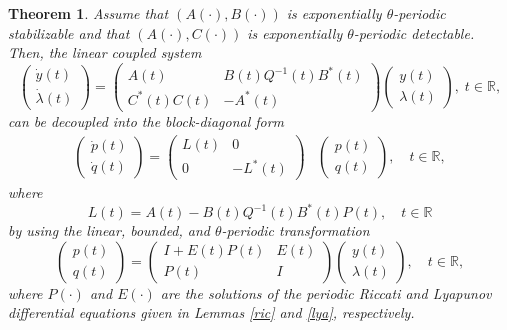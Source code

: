 \documentclass[10pt,a4paper]{amsart}
\newtheorem{theorem}{Theorem}
\begin{document}
	\begin{theorem}\label{dudic}
		Assume that $(A(\cdot),B(\cdot))$ is exponentially $\theta$-periodic stabilizable and that $(A(\cdot),C(\cdot))$ is exponentially $\theta$-periodic detectable. Then, the linear coupled system
		\begin{equation*}
			\begin{pmatrix}
				\dot{y}(t)\\\dot{\lambda}(t)
			\end{pmatrix}=
			\begin{pmatrix}
				A(t) & B(t)Q^{-1}(t)B^*(t)\\C^*(t)C(t)&-A^*(t)
			\end{pmatrix}\begin{pmatrix}
				y(t)\\ \lambda (t)
			\end{pmatrix},\; t\in\mathbb R,
		\end{equation*}
		can be decoupled into the block-diagonal form
		\begin{equation*}
			\begin{split}
				\begin{pmatrix}\dot{p}(t)\\ \dot{q}(t)\end{pmatrix}
				=
				\begin{pmatrix}
					L(t) & 0 \\
					0 & -L^*(t)
				\end{pmatrix}
				&
				\begin{pmatrix}p(t)\\ q(t)\end{pmatrix},\quad t\in\mathbb{R},
			\end{split}
		\end{equation*}
		where
		\begin{equation}\label{eq:A-BQ-1B*P}
			L(t)=A(t)-B(t)Q^{-1}(t)B^*(t)P(t),\quad t\in\mathbb{R}
		\end{equation}
		by using the linear, bounded, and $\theta$-periodic transformation
		\begin{equation}\label{ducan1}
			\begin{pmatrix}
				p(t)\\ q (t)
			\end{pmatrix}=
			\begin{pmatrix}
				I+E(t)P(t)&E(t)\\P(t)&I
			\end{pmatrix}
			\begin{pmatrix}
				y(t)\\  \lambda (t)
			\end{pmatrix},\quad t\in\mathbb R,
		\end{equation}
		where $P(\cdot)$ and $E(\cdot)$ are the solutions of the periodic Riccati and Lyapunov differential equations given in Lemmas \ref{ric} and \ref{lya}, respectively.
	\end{theorem}
\end{document}

